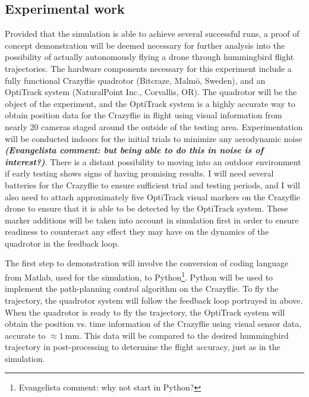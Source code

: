 \documentclass[onecolumn,10pt]{IEEEtran}
\newcommand{\MATLAB}{Matlab}
\begin{document}
\subsection{Experimental work}
	Provided that the simulation is able to achieve several successful runs, a proof of concept demonstration will be deemed necessary for further analysis into the possibility of actually autonomously flying a drone through hummingbird flight trajectories. The hardware components necessary for this experiment include a fully functional Crazyflie quadrotor (Bitcraze, Malm\"{o}, Sweden), and an OptiTrack system (NaturalPoint Inc., Corvallis, OR). The quadrotor will be the object of the experiment, and the OptiTrack system is a highly accurate way to obtain position data for the Crazyflie in flight using visual information from nearly 20 cameras staged around the outside of the testing area. Experimentation will be conducted indoors for the initial trials to minimize any aerodynamic noise \emph{\textbf{(Evangelista comment: but being able to do this in noise is of interest?)}}. There is a distant possibility to moving into an outdoor environment if early testing shows signs of having promising results. I will need several batteries for the Crazyflie to ensure sufficient trial and testing periods, and I will also need to attach approximately five OptiTrack visual markers on the Crazyflie drone to ensure that it is able to be detected by the OptiTrack system. These marker additions will be taken into account in simulation first in order to ensure readiness to counteract any effect they may have on the dynamics of the quadrotor in the feedback loop.
	
The first step to demonstration will involve the conversion of coding language from \MATLAB, used for the simulation, to Python\footnote{Evangelista comment: why not start in Python?}. Python will be used to implement the path-planning control algorithm on the Crazyflie. To fly the trajectory, the quadrotor system will follow the feedback loop portrayed in  above. When the quadrotor is ready to fly the trajectory, the OptiTrack system will obtain the position vs. time information of the Crazyflie using visual sensor data, accurate to $\approx \SI{1}{\milli\meter}$. This data will be compared to the desired hummingbird trajectory in post-processing to determine the flight accuracy, just as in the simulation.

\end{document}
